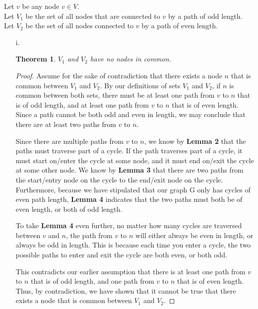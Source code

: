 \documentclass[10pt,letter]{article}
\newtheorem*{thm}{Theorem}
\begin{document}
Let $v$ be any node $v \in V$.\\
Let $V_1$ be the set of all nodes that are connected to $v$ by a path of odd length.\\
Let $V_2$ be the set of all nodes connected to $v$ by a path of even length.

\begin{enumerate}
\item[i.] \begin{thm} $V_1$ and $V_2$ have no nodes in common. \end{thm}
\begin{proof} Assume for the sake of contradiction that there exists a node $n$ that is common between $V_1$ and $V_2$. By our definitions of sets $V_1$ and $V_2$, if $n$ is common between both sets, there must be at least one path from $v$ to $n$ that is of odd length, and at least one path from $v$ to $n$ that is of even length. Since a path cannot be both odd and even in length, we may conclude that there are at least two paths from $v$ to $n$.

Since there are multiple paths from $v$ to $n$, we know by \textbf{Lemma 2} that the paths must traverse part of a cycle. If the path traverses part of a cycle, it must start on/enter the cycle at some node, and it must end on/exit the cycle at some other node. We know by \textbf{Lemma 3} that there are two paths from the start/entry node on the cycle to the end/exit node on the cycle. Furthermore, because we have stipulated that our graph G only has cycles of even path length, \textbf{Lemma 4} indicates that the two paths must both be of even length, or both of odd length. 

To take \textbf{Lemma 4} even further, no matter how many cycles are traversed between $v$ and $n$, the path from $v$ to $n$ will either always be even in length, or always be odd in length. This is because each time you enter a cycle, the two possible paths to enter and exit the cycle are both even, or both odd. 

This contradicts our earlier assumption that there is at least one path from $v$ to $n$ that is of odd length, and one path from $v$ to $n$ that is of even length. Thus, by contradiction, we have shown that it cannot be true that there exists a node that is common between $V_1$ and $V_2$.
\end{proof}


\end{enumerate}
\end{document}
